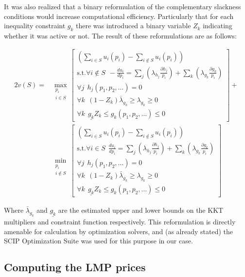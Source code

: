 It was also realized that a binary reformulation of the complementary slackness conditions would increase computational efficiency.
Particularly that for each inequality constraint $g_k$ there was introduced a binary variable $Z_k$ indicating whether it was active or not.
The result of these reformulations are as follows:

\begin{equation}
\label{optimization_eq1}
\begin{aligned}
2v(S) =& 
\max_{\substack{p_i \\ i\in S}}\left[\substack{
	\left(\sum_{i\in S}u_i(p_i) - \sum_{i\notin S}u_i(p_i)\right)\\
	\text{s.t.}\forall i\notin S~~-\frac{d u_i}{d p_i}=\sum_j(\lambda_{h_j}\frac{\partial h_j}{p_i}) + \sum_k(\lambda_{g_k}\frac{\partial g_k}{p_i})\\
	\forall j~~ h_j(p_1,p_2,\dots)=0\\
	\forall k~~ (1-Z_k)\bar{\lambda}_{g_k} \ge \lambda_{g_k} \ge 0\\
	\forall k~~ \underline{g_k}Z_k\le g_k(p_1,p_2,\dots) \le 0}
\right] +\\
&\min_{\substack{p_i \\ i\notin S}}\left[\substack{
	\left(\sum_{i\in S}u_i(p_i) - \sum_{i\notin S}u_i(p_i)\right)\\
	\text{s.t.}\forall i\in S~~\frac{d u_i}{d p_i}=\sum_j(\lambda_{h_j}\frac{\partial h_j}{p_i}) + \sum_k(\lambda_{g_k}\frac{\partial g_k}{p_i})\\
	\forall j~~ h_j(p_1,p_2,\dots)=0\\
	\forall k~~ (1-Z_k)\bar{\lambda}_{g_k} \ge \lambda_{g_k} \ge 0\\
	\forall k~~ \underline{g_k}Z_k\le g_k(p_1,p_2,\dots) \le 0}
\right]
\end{aligned}
\end{equation}

Where $\bar{\lambda}_{g_k}$ and $\underline{g_k}$ are the estimated upper and lower bounds on the KKT multipliers and constraint function respectively.
This reformulation is directly amenable for calculation by optimization solvers, and (as already stated) the SCIP Optimization Suite \cite{MaherFischerGallyetal.2017} 
was used for this purpose in our case.


\subsection{Computing the LMP prices}

